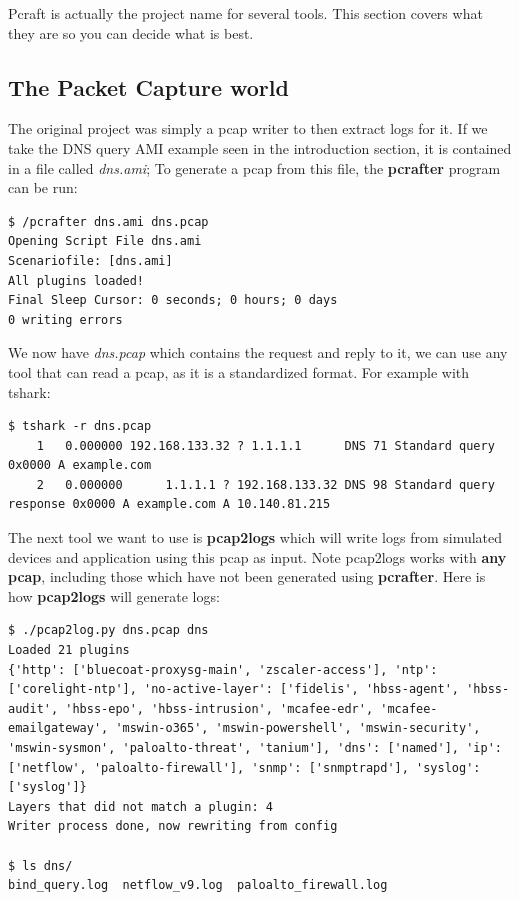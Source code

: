 \documentclass[10pt]{article}
\begin{document}
Pcraft is actually the project name for several tools. This section covers what they are so you can decide what is best.

\subsection{The Packet Capture world}
The original project was simply a pcap writer to then extract logs for it. If we take the DNS query AMI example seen in the introduction section, it is contained in a file called \textit{dns.ami}; To generate a pcap from this file, the \textbf{pcrafter} program can be run:

\begin{lstlisting}[caption={Writing a pcap},captionpos=b]
$ /pcrafter dns.ami dns.pcap
Opening Script File dns.ami
Scenariofile: [dns.ami]
All plugins loaded!
Final Sleep Cursor: 0 seconds; 0 hours; 0 days
0 writing errors
\end{lstlisting}

We now have \textit{dns.pcap} which contains the request and reply to it, we can use any tool that can read a pcap, as it is a standardized format. For example with tshark:
\begin{lstlisting}[caption={Reading dns.pcap using tshark},captionpos=b]
$ tshark -r dns.pcap
    1   0.000000 192.168.133.32 ? 1.1.1.1      DNS 71 Standard query 0x0000 A example.com
    2   0.000000      1.1.1.1 ? 192.168.133.32 DNS 98 Standard query response 0x0000 A example.com A 10.140.81.215    
\end{lstlisting}

The next tool we want to use is \textbf{pcap2logs} which will write logs from simulated devices and application using this pcap as input. Note pcap2logs works with \textbf{any pcap}, including those which have not been generated using \textbf{pcrafter}. Here is how \textbf{pcap2logs} will generate logs:
\begin{lstlisting}[caption={Generating logs from a pcap},captionpos=b]
$ ./pcap2log.py dns.pcap dns
Loaded 21 plugins
{'http': ['bluecoat-proxysg-main', 'zscaler-access'], 'ntp': ['corelight-ntp'], 'no-active-layer': ['fidelis', 'hbss-agent', 'hbss-audit', 'hbss-epo', 'hbss-intrusion', 'mcafee-edr', 'mcafee-emailgateway', 'mswin-o365', 'mswin-powershell', 'mswin-security', 'mswin-sysmon', 'paloalto-threat', 'tanium'], 'dns': ['named'], 'ip': ['netflow', 'paloalto-firewall'], 'snmp': ['snmptrapd'], 'syslog': ['syslog']}
Layers that did not match a plugin: 4
Writer process done, now rewriting from config

$ ls dns/
bind_query.log	netflow_v9.log	paloalto_firewall.log  
\end{lstlisting}
\end{document}
